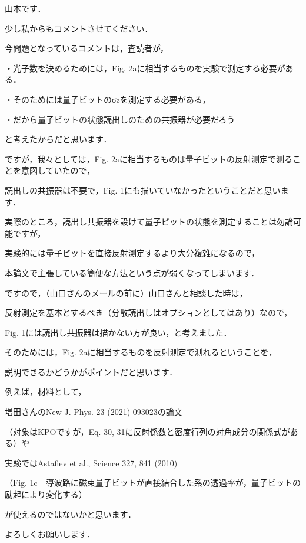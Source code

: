  

山本です．

少し私からもコメントさせてください．

 

今問題となっているコメントは，査読者が，

・光子数を決めるためには，Fig. 2aに相当するものを実験で測定する必要がある．

・そのためには量子ビットのσzを測定する必要がある，

・だから量子ビットの状態読出しのための共振器が必要だろう

と考えたからだと思います．

 

ですが，我々としては，Fig. 2aに相当するものは量子ビットの反射測定で測ることを意図していたので，

読出しの共振器は不要で，Fig. 1にも描いていなかったということだと思います．

 

実際のところ，読出し共振器を設けて量子ビットの状態を測定することは勿論可能ですが，

実験的には量子ビットを直接反射測定するより大分複雑になるので，

本論文で主張している簡便な方法という点が弱くなってしまいます．

 

ですので，（山口さんのメールの前に）山口さんと相談した時は，

反射測定を基本とするべき（分散読出しはオプションとしてはあり）なので，

Fig. 1には読出し共振器は描かない方が良い，と考えました．

 

そのためには，Fig. 2aに相当するものを反射測定で測れるということを，

説明できるかどうかがポイントだと思います．

例えば，材料として，

増田さんのNew J. Phys. 23 (2021) 093023の論文

（対象はKPOですが，Eq. 30, 31に反射係数と密度行列の対角成分の関係式がある）や

実験ではAstafiev et al., Science 327, 841 (2010)

（Fig. 1c　導波路に磁束量子ビットが直接結合した系の透過率が，量子ビットの励起により変化する）

が使えるのではないかと思います．

 

よろしくお願いします．

